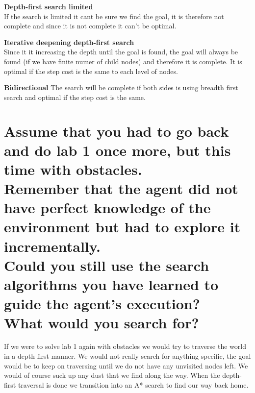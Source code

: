 \documentclass{article}
\begin{document}
\textbf{Depth-first search limited}\\
If the search is limited it cant be sure we find the goal, it is therefore not complete and since it is not complete it can't be optimal.

\textbf{Iterative deepening depth-first search}\\
Since it it increasing the depth until the goal is found, the goal will always be found (if we have finite numer of child nodes) and therefore it is complete.
It is optimal if the step cost is the same to each level of nodes. 

\textbf{Bidirectional}
The search will be complete if both sides is using breadth first search and optimal if the step cost is the same. 

\section*{Assume that you had to go back and do lab 1 once more, but this time with obstacles.\\Remember that the agent did not have perfect knowledge of the
environment but had to explore it incrementally.\\Could you still use the search algorithms you have learned to guide the agent's execution?\\What would you search for?}

If we were to solve lab 1 again with obstacles we would try to traverse the world in a depth first manner. We would not really search for anything specific,
the goal would be to keep on traversing until we do not have any unvisited nodes left. We would of course suck up any dust that we find along the way.
When the depth-first traversal is done we transition into an A* search to find our way back home.
\end{document}
